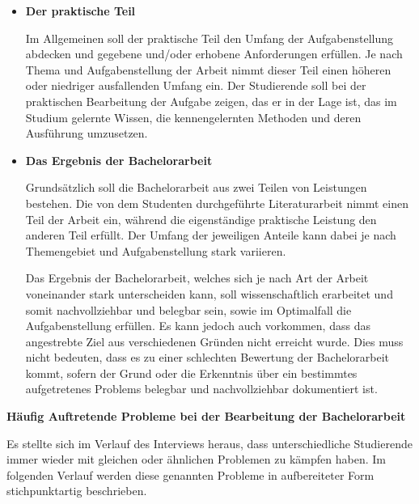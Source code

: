 \documentclass{scrreprt}
\begin{document}
\begin{itemize}
\item \textbf{Der praktische Teil}
\par Im Allgemeinen soll der praktische Teil den Umfang der Aufgabenstellung abdecken und gegebene und/oder erhobene Anforderungen erfüllen. Je nach Thema und Aufgabenstellung der Arbeit nimmt dieser Teil einen höheren oder niedriger ausfallenden Umfang ein.
Der Studierende soll bei der praktischen Bearbeitung der Aufgabe zeigen, das er in der Lage ist, das im Studium gelernte Wissen, die kennengelernten Methoden und deren Ausführung umzusetzen. 
\item \textbf{Das Ergebnis der Bachelorarbeit}
\par Grundsätzlich soll die Bachelorarbeit aus zwei Teilen von Leistungen bestehen. Die von dem Studenten durchgeführte Literaturarbeit nimmt einen Teil der Arbeit ein, während die eigenständige praktische Leistung den anderen Teil erfüllt. Der Umfang der jeweiligen Anteile kann dabei je nach Themengebiet und Aufgabenstellung stark variieren.
\par Das Ergebnis der Bachelorarbeit, welches sich je nach Art der Arbeit voneinander stark unterscheiden kann, soll wissenschaftlich erarbeitet und somit nachvollziehbar und belegbar sein, sowie im Optimalfall die Aufgabenstellung erfüllen. Es kann jedoch auch vorkommen, dass das angestrebte Ziel aus verschiedenen Gründen nicht erreicht wurde. Dies muss nicht bedeuten, dass es zu einer schlechten Bewertung der Bachelorarbeit kommt, sofern der Grund oder die Erkenntnis über ein bestimmtes aufgetretenes Problems belegbar und nachvollziehbar dokumentiert ist.
\end{itemize}

\textbf{Häufig Auftretende Probleme bei der Bearbeitung der Bachelorarbeit}
\par Es stellte sich im Verlauf des Interviews heraus, dass unterschiedliche Studierende immer wieder mit gleichen oder ähnlichen Problemen zu kämpfen haben. Im folgenden Verlauf werden diese genannten Probleme in aufbereiteter Form stichpunktartig beschrieben.\\
\end{document}
